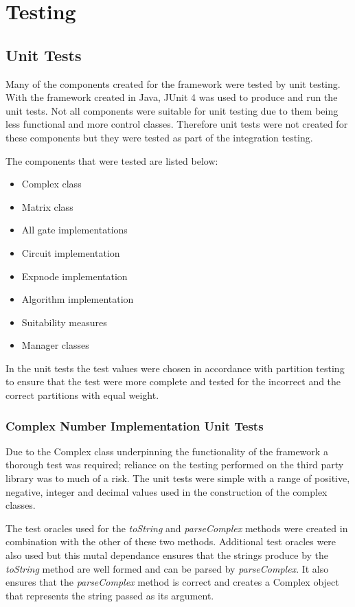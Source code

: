 \chapter{Testing}
\section{Unit Tests}
\label{sec:unittests}
Many of the components created for the framework were tested by unit testing.
With the framework created in Java, JUnit 4\cite{junitweb} was used to produce and run the unit tests.
Not all components were suitable for unit testing due to them being less functional and more control classes.
Therefore unit tests were not created for these components but they were tested as part of the integration testing.

The components that were tested are listed below:
\begin{itemize}
 \item Complex class
 \item Matrix class
 \item All gate implementations
 \item Circuit implementation
 \item Expnode implementation
 \item Algorithm implementation
 \item Suitability measures
 \item Manager classes
\end{itemize}

In the unit tests the test values were chosen in accordance with partition testing to ensure that the test were more complete and tested for the incorrect and the correct partitions with equal weight.

\subsection{Complex Number Implementation Unit Tests}
Due to the Complex class underpinning the functionality of the framework a thorough test was required; reliance on the testing performed on the third party library was to much of a risk.
The unit tests were simple with a range of positive, negative, integer and decimal values used in the construction of the complex classes.

The test oracles used for the \emph{toString} and \emph{parseComplex} methods were created in combination with the other of these two methods.
Additional test oracles were also used but this mutal dependance ensures that the strings produce by the \emph{toString} method are well formed and can be parsed by \emph{parseComplex}.
It also ensures that the \emph{parseComplex} method is correct and creates a Complex object that represents the string passed as its argument.

